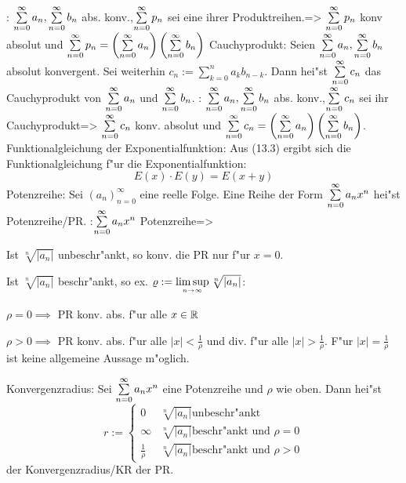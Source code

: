 \theorem:
  $\sumn 0 a_n,\sumn 0 b_n$ abs. konv.,$\sumn 0 p_n$ sei eine ihrer
  Produktreihen.=>{
  $\sumn 0 p_n$ konv absolut und 
  $\sumn 0 p_n=\left(\sumn 0 a_n\right)\left(\sumn 0  b_n\right)$
  }
 Cauchyprodukt:{
  Seien $\sumn 0 a_n,\sumn 0 b_n$ absolut konvergent. Sei weiterhin
  $c_n:=\sum_{k=0}^n a_k b_{n-k}$. Dann hei"st $\sumn 0 c_n$ das
  Cauchyprodukt von $\sumn 0 a_n$ und $\sumn 0 b_n$.
}
\theorem:
  $\sumn 0 a_n,\sumn 0 b_n$ abs. konv.,$\sumn 0 c_n$ sei ihr Cauchyprodukt=>{
  $\sumn 0 c_n$ konv. absolut und 
  $\sumn 0 c_n=\left(\sumn 0 a_n\right)\left(\sumn 0  b_n\right)$.
  }
\remark Funktionalgleichung der Exponentialfunktion:{
  Aus (13.3) ergibt sich die Funktionalgleichung f"ur die Exponentialfunktion:
  \[E(x)\cdot E(y)=E(x+y)
    \]
  }
 Potenzreihe:{
  \label{def:potenzreihe}
  Sei $(a_n)_{n=0}^\infty$ eine reelle Folge. Eine Reihe der Form
  $\sumn 0 a_n x^n$ hei"st Potenzreihe/PR.
  }
\theorem:$\sumn 0 a_n x^n$ Potenzreihe=>{
  \begin{stmts}
    \item Ist $\sqrt[n]{|a_n|}$ unbeschr"ankt,
      so konv. die PR nur f"ur $x=0$.
    \item Ist $\sqrt[n]{|a_n|}$ beschr"ankt,
      so ex. $\rho:=\limsupn \sqrt[n]{|a_n|}$:
    \item $\rho=0 \implies$ PR konv. abs. f"ur alle $x\in\mathbb R$
    \item $\rho>0 \implies$ PR konv. abs. f"ur alle $|x|<\frac 1 \rho$
      und div. f"ur alle $|x|>\frac 1 \rho$.
      F"ur $|x|=\frac 1 \rho$ ist keine allgemeine Aussage m"oglich.
    \end{stmts}
  }
 Konvergenzradius:{
  Sei $\sumn 0 a_n x^n$ eine Potenzreihe und $\rho$ wie oben. 
  Dann hei"st
  \[r:=\begin{cases}
      0                 & \sqrt[n]{|a_n|} \text{unbeschr"ankt} \\
      \infty            & \sqrt[n]{|a_n|} \text{beschr"ankt und $\rho=0$} \\
      \frac 1 \rho      & \sqrt[n]{|a_n|} \text{beschr"ankt und $\rho>0$}
      \end{cases}
    \]
  der Konvergenzradius/KR der PR.
  }
